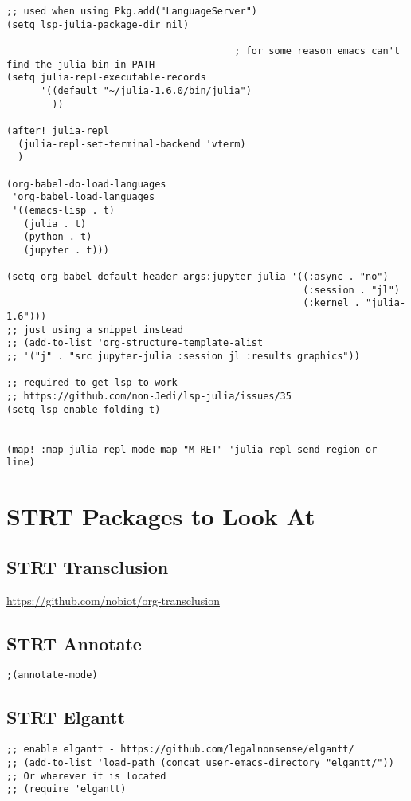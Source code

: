 \documentclass[8pt]{article}
\begin{document}
\begin{verbatim}
;; used when using Pkg.add("LanguageServer")
(setq lsp-julia-package-dir nil)

                                        ; for some reason emacs can't find the julia bin in PATH
(setq julia-repl-executable-records
      '((default "~/julia-1.6.0/bin/julia")
        ))

(after! julia-repl
  (julia-repl-set-terminal-backend 'vterm)
  )

(org-babel-do-load-languages
 'org-babel-load-languages
 '((emacs-lisp . t)
   (julia . t)
   (python . t)
   (jupyter . t)))

(setq org-babel-default-header-args:jupyter-julia '((:async . "no")
                                                    (:session . "jl")
                                                    (:kernel . "julia-1.6")))
;; just using a snippet instead
;; (add-to-list 'org-structure-template-alist
;; '("j" . "src jupyter-julia :session jl :results graphics"))

;; required to get lsp to work
;; https://github.com/non-Jedi/lsp-julia/issues/35
(setq lsp-enable-folding t)


(map! :map julia-repl-mode-map "M-RET" 'julia-repl-send-region-or-line)
\end{verbatim}
\section{{\bfseries\sffamily STRT} Packages to Look At}
\label{sec:org797adbd}
\subsection{{\bfseries\sffamily STRT} Transclusion}
\label{sec:orga395944}
\url{https://github.com/nobiot/org-transclusion}
\subsection{{\bfseries\sffamily STRT} Annotate}
\label{sec:org910a30c}
\begin{verbatim}
;(annotate-mode)
\end{verbatim}

\subsection{{\bfseries\sffamily STRT} Elgantt}
\label{sec:org8e6067a}
\begin{verbatim}
;; enable elgantt - https://github.com/legalnonsense/elgantt/
;; (add-to-list 'load-path (concat user-emacs-directory "elgantt/")) ;; Or wherever it is located
;; (require 'elgantt)
\end{verbatim}
\end{document}
